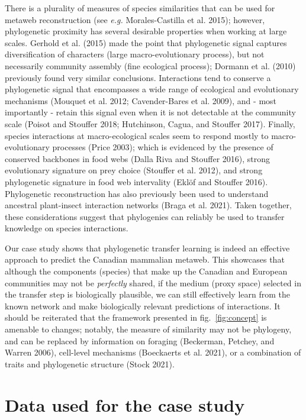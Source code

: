 \documentclass[10pt,oneside]{article}
\begin{document}
There is a plurality of measures of species similarities that can be
used for metaweb reconstruction (see \emph{e.g.} Morales-Castilla et al.
2015); however, phylogenetic proximity has several desirable properties
when working at large scales. Gerhold et al. (2015) made the point that
phylogenetic signal captures diversification of characters (large
macro-evolutionary process), but not necessarily community assembly
(fine ecological process); Dormann et al. (2010) previously found very
similar conclusions. Interactions tend to conserve a phylogenetic signal
that encompasses a wide range of ecological and evolutionary mechanisms
(Mouquet et al. 2012; Cavender-Bares et al. 2009), and - most
importantly - retain this signal even when it is not detectable at the
community scale (Poisot and Stouffer 2018; Hutchinson, Cagua, and
Stouffer 2017). Finally, species interactions at macro-ecological scales
seem to respond mostly to macro-evolutionary processes (Price 2003);
which is evidenced by the presence of conserved backbones in food webs
(Dalla Riva and Stouffer 2016), strong evolutionary signature on prey
choice (Stouffer et al. 2012), and strong phylogenetic signature in food
web intervality (Eklöf and Stouffer 2016). Phylogenetic reconstruction
has also previously been used to understand ancestral plant-insect
interaction networks (Braga et al. 2021). Taken together, these
considerations suggest that phylogenies can reliably be used to transfer
knowledge on species interactions.

Our case study shows that phylogenetic transfer learning is indeed an
effective approach to predict the Canadian mammalian metaweb. This
showcases that although the components (species) that make up the
Canadian and European communities may not be \emph{perfectly} shared, if
the medium (proxy space) selected in the transfer step is biologically
plausible, we can still effectively learn from the known network and
make biologically relevant predictions of interactions. It should be
reiterated that the framework presented in fig.~\ref{fig:concept} is
amenable to changes; notably, the measure of similarity may not be
phylogeny, and can be replaced by information on foraging (Beckerman,
Petchey, and Warren 2006), cell-level mechanisms (Boeckaerts et al.
2021), or a combination of traits and phylogenetic structure (Stock
2021).

\hypertarget{data-used-for-the-case-study}{%
\section{Data used for the case
study}\label{data-used-for-the-case-study}}
\end{document}
